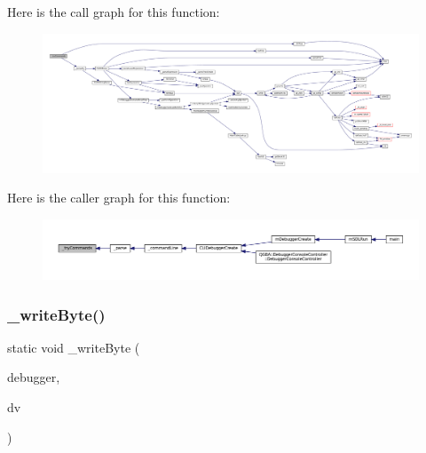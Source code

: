 Here is the call graph for this function\+:
\nopagebreak
\begin{figure}[H]
\begin{center}
\leavevmode
\includegraphics[width=350pt]{debugger_2cli-debugger_8c_afe13a4b051acdd4ffee4a8bdaf89651b_cgraph}
\end{center}
\end{figure}
Here is the caller graph for this function\+:
\nopagebreak
\begin{figure}[H]
\begin{center}
\leavevmode
\includegraphics[width=350pt]{debugger_2cli-debugger_8c_afe13a4b051acdd4ffee4a8bdaf89651b_icgraph}
\end{center}
\end{figure}
\mbox{\label{debugger_2cli-debugger_8c_ac5ac1c482e79eff2eab004ce9383e849}} 
\subsubsection{\texorpdfstring{\+\_\+write\+Byte()}{\_writeByte()}}
{\footnotesize\ttfamily static void \+\_\+write\+Byte (\begin{DoxyParamCaption}\item[{struct C\+L\+I\+Debugger $\ast$}]{debugger,  }\item[{struct C\+L\+I\+Debug\+Vector $\ast$}]{dv }\end{DoxyParamCaption})\hspace{0.3cm}{\ttfamily [static]}}

\mbox{\label{debugger_2cli-debugger_8c_a96e516203d239d2cb3ca1dfc1651fba0}} 
